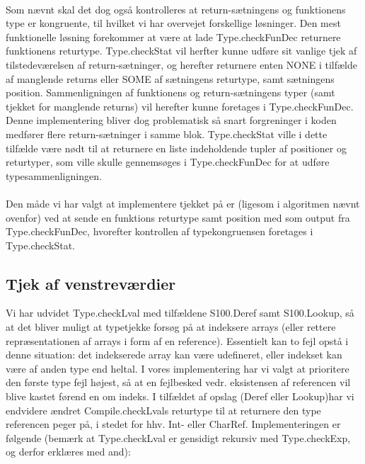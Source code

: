 \documentclass[10pt,a4paper,danish]{article}
\begin{document}
\paragraph{}
Som nævnt skal det dog også kontrolleres at return-sætningens og funktionens
type er kongruente, til hvilket vi har overvejet forskellige løsninger. Den
mest funktionelle løsning forekommer at være at lade Type.checkFunDec returnere
funktionens returtype. Type.checkStat vil herfter kunne udføre sit vanlige
tjek af tilstedeværelsen af return-sætninger, og herefter returnere enten NONE
i tilfælde af manglende returns eller SOME af sætningens returtype, samt
sætningens position. 
Sammenligningen af funktionens og return-sætningens typer (samt tjekket
for manglende returns) vil herefter kunne foretages i Type.checkFunDec.
Denne implementering bliver dog problematisk så 
snart forgreninger i koden medfører flere return-sætninger i samme blok.
Type.checkStat
ville i dette tilfælde være nødt til at returnere en liste indeholdende
tupler af positioner og returtyper, som ville skulle gennemsøges i 
Type.checkFunDec for at udføre typesammenligningen. 

\paragraph{}
Den måde vi har valgt at implementere tjekket på er (ligesom i algoritmen 
nævnt ovenfor) ved at sende en funktions returtype samt position med som 
output fra Type.checkFunDec, hvorefter kontrollen af typekongruensen foretages
i Type.checkStat. 


\subsection{Tjek af venstreværdier}
Vi har udvidet Type.checkLval med tilfældene S100.Deref samt
S100.Lookup, så at det bliver muligt at typetjekke forsøg på 
at indeksere arrays (eller rettere repræsentationen af arrays
i form af en reference). Essentielt kan to fejl opstå i denne 
situation: det indekserede array kan være udefineret, eller 
indekset kan være af anden type end heltal. I vores implementering
har vi valgt at prioritere den første type fejl højest, så at 
en fejlbesked vedr. eksistensen af referencen vil blive kastet
førend en om indeks. I tilfældet af opslag (Deref eller Lookup)har vi 
endvidere ændret Compile.checkLvals returtype til at returnere 
den type referencen peger på, i stedet for hhv. Int- eller CharRef. 
Implementeringen er følgende (bemærk at Type.checkLval er gensidigt
rekursiv med Type.checkExp, og derfor erklæres med and): 
\end{document}
